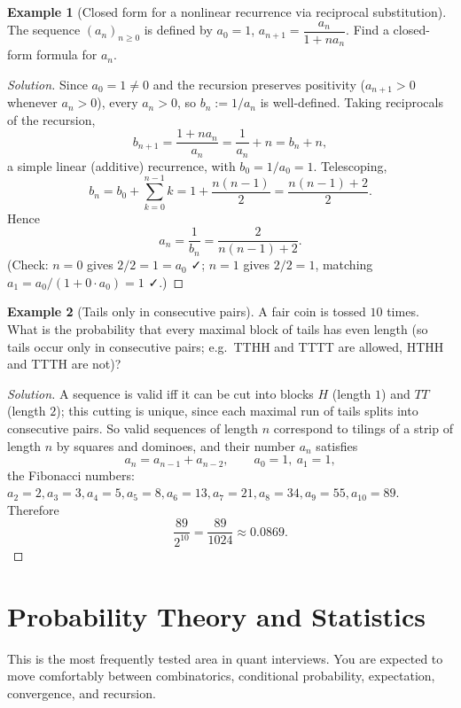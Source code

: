\documentclass[11pt]{article}
\theoremstyle{definition}
\newtheorem{example}{Example}[section]
\begin{document}
\begin{example}[Closed form for a nonlinear recurrence via reciprocal substitution]
The sequence $(a_n)_{n\ge0}$ is defined by $a_0=1$, $a_{n+1}=\dfrac{a_n}{1+na_n}$. Find a closed-form formula for $a_n$.
\end{example}
\begin{proof}[Solution]
Since $a_0=1\ne0$ and the recursion preserves positivity ($a_{n+1}>0$ whenever $a_n>0$), every $a_n>0$, so $b_n:=1/a_n$ is well-defined. Taking reciprocals of the recursion,
\[
b_{n+1}=\frac{1+na_n}{a_n}=\frac1{a_n}+n=b_n+n,
\]
a simple linear (additive) recurrence, with $b_0=1/a_0=1$. Telescoping,
\[
b_n=b_0+\sum_{k=0}^{n-1}k=1+\frac{n(n-1)}2=\frac{n(n-1)+2}2.
\]
Hence
\[
\boxed{a_n=\frac1{b_n}=\frac{2}{n(n-1)+2}}.
\]
(Check: $n=0$ gives $2/2=1=a_0$ ✓; $n=1$ gives $2/2=1$, matching $a_1=a_0/(1+0\cdot a_0)=1$ ✓.)
\end{proof}

\begin{example}[Tails only in consecutive pairs]
A fair coin is tossed $10$ times. What is the probability that every maximal block of tails has even length (so tails occur only in consecutive pairs; e.g.\ TTHH and TTTT are allowed, HTHH and TTTH are not)?
\end{example}

\begin{proof}[Solution]
A sequence is valid iff it can be cut into blocks $H$ (length $1$) and $TT$ (length $2$); this cutting is unique, since each maximal run of tails splits into consecutive pairs. So valid sequences of length $n$ correspond to tilings of a strip of length $n$ by squares and dominoes, and their number $a_n$ satisfies
\[
a_n=a_{n-1}+a_{n-2},\qquad a_0=1,\ a_1=1,
\]
the Fibonacci numbers: $a_2=2,a_3=3,a_4=5,a_5=8,a_6=13,a_7=21,a_8=34,a_9=55,a_{10}=89$. Therefore
\[
\boxed{\frac{89}{2^{10}}=\frac{89}{1024}\approx0.0869}.
\]
\end{proof}

\section{Probability Theory and Statistics}
This is the most frequently tested area in quant interviews. You are expected to move comfortably between combinatorics, conditional probability, expectation, convergence, and recursion.
\end{document}
